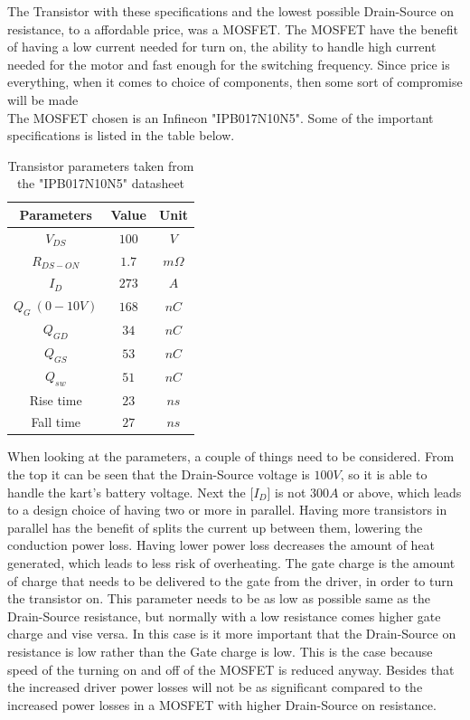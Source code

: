 The Transistor with these specifications and the lowest possible Drain-Source on resistance, to a affordable price, was a MOSFET. The MOSFET have the benefit of having a low current needed for turn on, the ability to handle high current needed for the motor and fast enough for the switching frequency. Since price is everything, when it comes to choice of components, then some sort of compromise will be made \\

The MOSFET chosen is an Infineon "IPB017N10N5". Some of the important specifications is listed in the table below.
\begin{table} [H]
\centering
 \begin{tabular}{|c|c|c|} 
 \hline
 \textbf{Parameters} & \textbf{Value} & \textbf{Unit} \\
 \hline
 \textbf{$V_{DS}$} & $100$ & $V$ \\  
 \hline
 \textbf{$R_{DS-ON}$} & $1.7$ & $m\Omega$ \\
 \hline
 \textbf{$I_D$} & $273$ & $A$ \\
 \hline
 \textbf{$Q_G\ (0-10V)$} & $168$ & $nC$ \\
 \hline
 \textbf{$Q_{GD}$} & $34$ & $nC$ \\
 \hline
 \textbf{$Q_{GS}$} & $53$ & $nC$ \\
 \hline
 \textbf{$Q_{sw}$} & $51$ & $nC$ \\
 \hline
 Rise time & $23$ & $ns$ \\
 \hline
 Fall time & $27$ & $ns$ \\
 \hline
\end{tabular}
\caption{Transistor parameters taken from the "IPB017N10N5" datasheet}
\end{table}

When looking at the parameters, a couple of things need to be considered. From the top it can be seen that the Drain-Source voltage is $100 V$, so it is able to handle the kart's battery voltage. Next the  [$I_D$] is not $300 A$ or above, which leads to a design choice of having two or more in parallel. Having more transistors in parallel has the benefit of splits the current up between them, lowering the conduction power loss. Having lower power loss decreases the amount of heat generated, which leads to less risk of overheating. The gate charge is the amount of charge that needs to be delivered to the gate from the driver, in order to turn the transistor on. This parameter needs to be as low as possible same as the Drain-Source resistance, but normally with a low resistance comes higher gate charge and vise versa. In this case is it more important that the Drain-Source on resistance is low rather than the Gate charge is low. This is the case because speed of the turning on and off of the MOSFET is reduced anyway. Besides that the increased driver power losses will not be as significant compared to the increased power losses in a MOSFET with higher Drain-Source on resistance.\\ 


